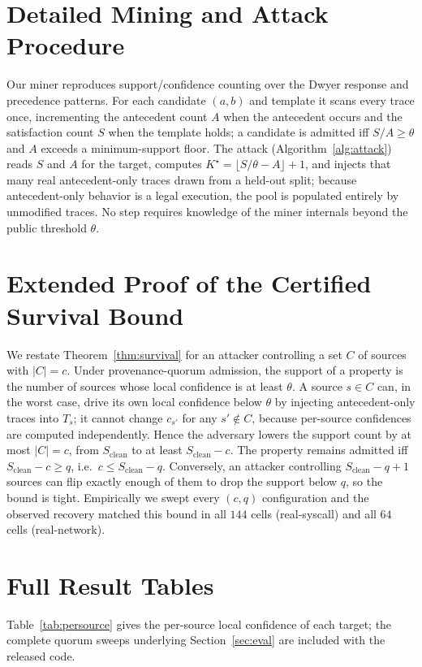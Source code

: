 \documentclass[runningheads]{llncs}
\begin{document}
\appendix
\section{Detailed Mining and Attack Procedure}\label{app:proc}
Our miner reproduces support/confidence counting over the Dwyer response and
precedence patterns. For each candidate $(a,b)$ and template it scans every trace
once, incrementing the antecedent count $A$ when the antecedent occurs and the
satisfaction count $S$ when the template holds; a candidate is admitted iff
$S/A\ge\theta$ and $A$ exceeds a minimum-support floor. The attack
(Algorithm~\ref{alg:attack}) reads $S$ and $A$ for the target, computes
$K^\star=\lfloor S/\theta-A\rfloor+1$, and injects that many real antecedent-only
traces drawn from a held-out split; because antecedent-only behavior is a legal
execution, the pool is populated entirely by unmodified traces. No step requires
knowledge of the miner internals beyond the public threshold $\theta$.

\section{Extended Proof of the Certified Survival Bound}\label{app:proof}
We restate Theorem~\ref{thm:survival} for an attacker controlling a set
$C$ of sources with $|C|=c$. Under provenance-quorum admission, the support of a
property is the number of sources whose local confidence is at least $\theta$.
A source $s\in C$ can, in the worst case, drive its own local confidence below
$\theta$ by injecting antecedent-only traces into $T_s$; it cannot change $c_{s'}$
for any $s'\notin C$, because per-source confidences are computed independently.
Hence the adversary lowers the support count by at most $|C|=c$, from
$S_{\mathrm{clean}}$ to at least $S_{\mathrm{clean}}-c$. The property remains
admitted iff $S_{\mathrm{clean}}-c\ge q$, i.e.\ $c\le S_{\mathrm{clean}}-q$.
Conversely, an attacker controlling $S_{\mathrm{clean}}-q+1$ sources can flip
exactly enough of them to drop the support below $q$, so the bound is tight.
Empirically we swept every $(c,q)$ configuration and the observed
recovery matched this bound in all $144$ cells (real-syscall) and all $64$ cells
(real-network).

\section{Full Result Tables}\label{app:tables}
Table~\ref{tab:persource} gives the per-source local confidence of each target; the complete quorum sweeps underlying Section~\ref{sec:eval} are included with the released code.
\end{document}

